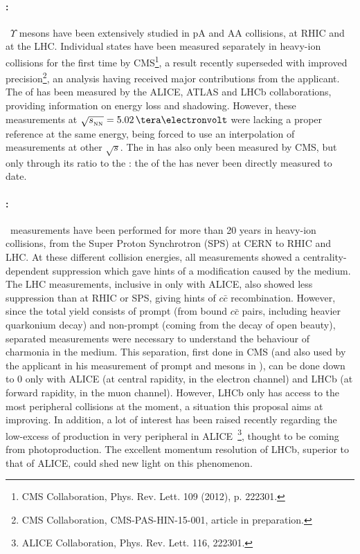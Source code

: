 \documentclass[a4paper,11pt]{article}
\begin{document}
\paragraph{\PgUabc:\ }\ 
$\Upsilon$ mesons have been extensively studied in pA and AA collisions, at RHIC and at the LHC. Individual
\PgUabc states have been measured separately in heavy-ion collisions for the first time by CMS\footnote{CMS Collaboration, Phys. Rev. Lett. 109 (2012), p. 222301. },
a result recently superseded with improved precision\footnote{CMS Collaboration, CMS-PAS-HIN-15-001, article in preparation.}, an analysis having received major contributions from the applicant. The \rpa of \PgUa has been measured by the ALICE, ATLAS and LHCb collaborations, providing information on energy loss and shadowing. However,
these measurements at $\sqrtsnn = 5.02\,\TeV$ were lacking a proper \pp reference at the same energy, being forced to use an interpolation of measurements at other
$\sqrt{s}$. The \PgUc in \ppb has also only been measured by CMS, but only through its ratio to the \PgUa: the \rpa of the \PgUc has never been directly measured to date.

\paragraph{\Jpsi:\ }\ 
\Jpsi measurements have been performed for more than 20 years in heavy-ion collisions, from the Super Proton Synchrotron (SPS) at CERN to RHIC and LHC. 
At these different collision energies, all measurements showed a centrality-dependent suppression
which gave hints of a modification caused by the medium. The LHC measurements, inclusive in \pt only with ALICE, also showed less
suppression than at RHIC or SPS, giving hints of $c\bar{c}$ recombination. However, since the total \Jpsi yield 
consists of prompt \Jpsi (from bound $c\bar{c}$ pairs, including heavier quarkonium decay) and non-prompt \Jpsi (coming
from the decay of open beauty), separated measurements were necessary to understand the behaviour of charmonia in the medium. 
This separation, first done in CMS (and also used by the applicant in his measurement of prompt \Jpsi and \psiP mesons in \pbpb), can be done down to 0 \pt only with ALICE (at central rapidity, in the electron channel) and LHCb (at forward rapidity, in the muon channel).
However, LHCb only has access to the most peripheral \pbpb collisions at the moment, a situation this proposal aims at improving. In addition, a lot of interest has been
raised recently regarding the low-\pt excess of \Jpsi production in very peripheral \pbpb in ALICE~\footnote{ALICE Collaboration, Phys. Rev. Lett. 116, 222301.}, thought to be coming from photoproduction. The 
excellent momentum resolution of LHCb, superior to that of ALICE, could shed new light on this phenomenon.
\end{document}

